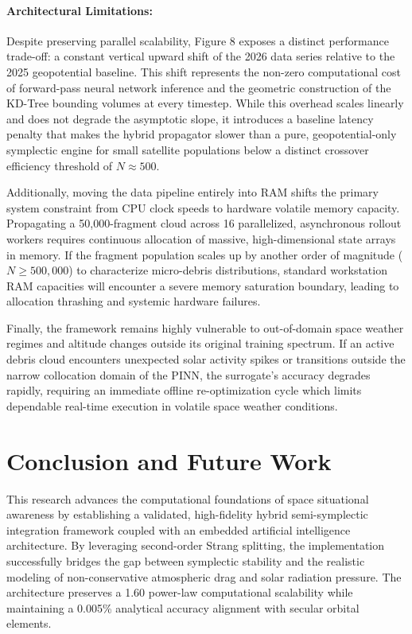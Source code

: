 \documentclass[letterpaper,11pt]{AAS}
\begin{document}
\paragraph{Architectural Limitations:}
Despite preserving parallel scalability, Figure 8 exposes a distinct performance trade-off: a constant vertical upward shift of the 2026 data series relative to the 2025 geopotential baseline. This shift represents the non-zero computational cost of forward-pass neural network inference and the geometric construction of the KD-Tree bounding volumes at every timestep. While this overhead scales linearly and does not degrade the asymptotic slope, it introduces a baseline latency penalty that makes the hybrid propagator slower than a pure, geopotential-only symplectic engine for small satellite populations below a distinct crossover efficiency threshold of $N \approx 500$.

Additionally, moving the data pipeline entirely into RAM shifts the primary system constraint from CPU clock speeds to hardware volatile memory capacity. Propagating a 50,000-fragment cloud across 16 parallelized, asynchronous rollout workers requires continuous allocation of massive, high-dimensional state arrays in memory. If the fragment population scales up by another order of magnitude ($N \ge 500,000$) to characterize micro-debris distributions, standard workstation RAM capacities will encounter a severe memory saturation boundary, leading to allocation thrashing and systemic hardware failures. 

Finally, the framework remains highly vulnerable to out-of-domain space weather regimes and altitude changes outside its original training spectrum. If an active debris cloud encounters unexpected solar activity spikes or transitions outside the narrow collocation domain of the PINN, the surrogate's accuracy degrades rapidly, requiring an immediate offline re-optimization cycle which limits dependable real-time execution in volatile space weather conditions.

\section{Conclusion and Future Work}

This research advances the computational foundations of space situational awareness by establishing a validated, high-fidelity hybrid semi-symplectic integration framework coupled with an embedded artificial intelligence architecture. By leveraging second-order Strang splitting, the implementation successfully bridges the gap between symplectic stability and the realistic modeling of non-conservative atmospheric drag and solar radiation pressure. The architecture preserves a 1.60 power-law computational scalability while maintaining a 0.005\% analytical accuracy alignment with secular orbital elements.
\end{document}
